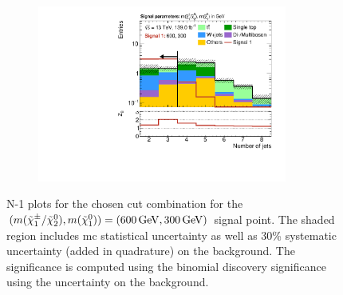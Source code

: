 \begin{figure}
\begin{subfigure}[b]{0.5\linewidth}
	\end{subfigure}\hfill
	\begin{subfigure}[b]{0.5\linewidth}
		\centering\includegraphics[width=0.9\textwidth]{N-1_cut_scan/n1_600_300/nJet30}
	\end{subfigure}

	\caption[N-1 plots for the chosen cut combination for the (600, 300) signal point]{N-1 plots for the chosen cut combination for the $(m(\charg/\neutr), m(\lsp)) = (\SI{600}{\GeV}, \SI{300}{\GeV})$ signal point. The shaded region includes \gls{mc} statistical uncertainty as well as 30\% systematic uncertainty (added in quadrature) on the background. The significance is computed using the binomial discovery significance using the uncertainty on the background.}
	\label{fig:results_n1_600_300}
\end{figure}

